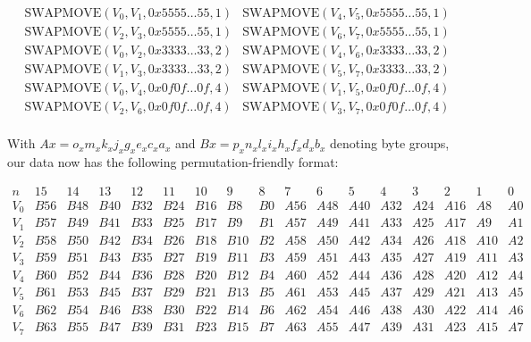 \begin{align*}
    &\text{SWAPMOVE}(V_0,V_1,0x5555\dots 55,1) &\text{SWAPMOVE}(V_4,V_5,0x5555\dots 55,1) \\
    &\text{SWAPMOVE}(V_2,V_3,0x5555\dots 55,1) &\text{SWAPMOVE}(V_6,V_7,0x5555\dots 55,1) \\
    &\text{SWAPMOVE}(V_0,V_2,0x3333\dots 33,2) &\text{SWAPMOVE}(V_4,V_6,0x3333\dots 33,2) \\
    &\text{SWAPMOVE}(V_1,V_3,0x3333\dots 33,2) &\text{SWAPMOVE}(V_5,V_7,0x3333\dots 33,2) \\
    &\text{SWAPMOVE}(V_0,V_4,0x0f0f\dots 0f,4) &\text{SWAPMOVE}(V_1,V_5,0x0f0f\dots 0f,4) \\
    &\text{SWAPMOVE}(V_2,V_6,0x0f0f\dots 0f,4) &\text{SWAPMOVE}(V_3,V_7,0x0f0f\dots 0f,4) \\
\end{align*}

With $Ax=o_xm_xk_xj_xg_xe_xc_xa_x$ and $Bx=p_xn_xl_xi_xh_xf_xd_xb_x$ denoting
byte groups, our data now has the following permutation-friendly format:

\scriptsize
\[
    \begin{array}{c|llllllll|llllllll}
        n & 15 & 14 & 13 & 12 & 11 & 10 & 9 & 8 & 7 & 6 & 5 & 4 & 3 & 2 & 1 & 0 \\
        \hline
        V_0 & B56 & B48 & B40 & B32 & B24 & B16 & B8  & B0 & A56 & A48 & A40 & A32 & A24 & A16 & A8  & A0 \\
        V_1 & B57 & B49 & B41 & B33 & B25 & B17 & B9  & B1 & A57 & A49 & A41 & A33 & A25 & A17 & A9  & A1 \\
        V_2 & B58 & B50 & B42 & B34 & B26 & B18 & B10 & B2 & A58 & A50 & A42 & A34 & A26 & A18 & A10 & A2 \\
        V_3 & B59 & B51 & B43 & B35 & B27 & B19 & B11 & B3 & A59 & A51 & A43 & A35 & A27 & A19 & A11 & A3 \\
        V_4 & B60 & B52 & B44 & B36 & B28 & B20 & B12 & B4 & A60 & A52 & A44 & A36 & A28 & A20 & A12 & A4 \\
        V_5 & B61 & B53 & B45 & B37 & B29 & B21 & B13 & B5 & A61 & A53 & A45 & A37 & A29 & A21 & A13 & A5 \\
        V_6 & B62 & B54 & B46 & B38 & B30 & B22 & B14 & B6 & A62 & A54 & A46 & A38 & A30 & A22 & A14 & A6 \\
        V_7 & B63 & B55 & B47 & B39 & B31 & B23 & B15 & B7 & A63 & A55 & A47 & A39 & A31 & A23 & A15 & A7
    \end{array}
\]
\normalsize

